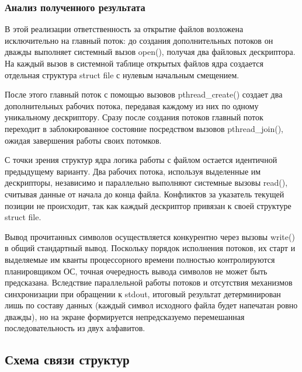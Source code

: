 \subsubsection{Анализ полученного результата}



В этой реализации ответственность за открытие файлов возложена исключительно 
на главный поток: до создания дополнительных потоков он дважды выполняет системный 
вызов open(), получая два файловых дескриптора. На каждый вызов в системной таблице 
открытых файлов ядра создается отдельная структура struct file с нулевым 
начальным смещением.

После этого главный поток с помощью вызовов pthread\_create() создает два дополнительных 
рабочих потока, передавая каждому из них по одному уникальному дескриптору. 
Сразу после создания потоков главный поток переходит в заблокированное состояние 
посредством вызовов pthread\_join(), ожидая завершения работы своих потомков.

С точки зрения структур ядра логика работы с файлом остается идентичной предыдущему 
варианту. Два рабочих потока, используя выделенные им дескрипторы, независимо 
и параллельно выполняют системные вызовы read(), считывая данные от начала до 
конца файла. Конфликтов за указатель текущей позиции не происходит, так как 
каждый дескриптор привязан к своей структуре struct file.

Вывод прочитанных символов осуществляется конкурентно через вызовы write() в 
общий стандартный вывод. Поскольку порядок исполнения потоков, их старт и 
выделяемые им кванты процессорного времени полностью контролируются планировщиком 
ОС, точная очередность вывода символов не может быть предсказана. Вследствие 
параллельной работы потоков и отсутствия механизмов синхронизации при обращении к 
stdout, итоговый результат детерминирован лишь по составу данных (каждый символ 
исходного файла будет напечатан ровно дважды), но на экране формируется непредсказуемо 
перемешанная последовательность из двух алфавитов.

\subsection{Схема связи структур}
